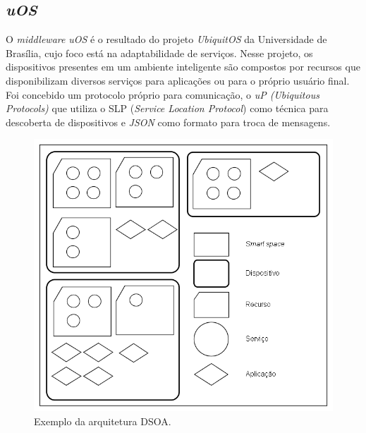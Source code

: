 \subsection{\emph{uOS}}
\label{subsec:introUos}

O \emph{middleware} \emph{uOS} é o resultado do projeto \emph{UbiquitOS} da Universidade de Brasília, cujo foco está na adaptabilidade de serviços. Nesse projeto, os dispositivos presentes em um ambiente inteligente são compostos por recursos que disponibilizam diversos serviços para aplicações ou para o próprio usuário final. Foi concebido um protocolo próprio para comunicação, o \emph{uP (Ubiquitous Protocols)} que utiliza o SLP (\emph{Service Location Protocol}) como técnica para descoberta de dispositivos e \emph{JSON} como formato para troca de mensagens.

\begin{figure}[ht]
	\center
	\includegraphics[scale=0.6]{imagens/arquiteturaDSOA}
	\caption{Exemplo da arquitetura DSOA.}
	\label{fig:arquiteturaDSOA}
\end{figure}

